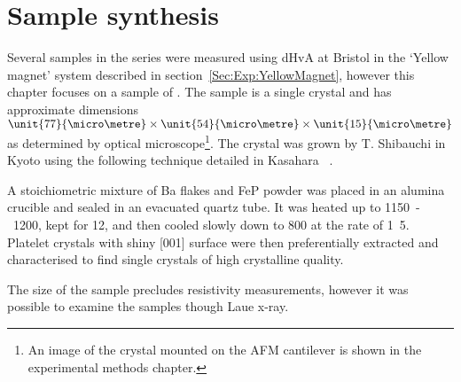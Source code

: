 \section{Sample synthesis}

Several samples in the \BaFeAsP{} series were measured using \ac{dHvA} at Bristol in the `Yellow magnet' system described in section~\ref{Sec:Exp:YellowMagnet}, however this chapter focuses on a sample of \BaFeP. The sample is a single crystal and has approximate dimensions $\unit{77}{\micro\metre}\times\unit{54}{\micro\metre}\times \unit{15}{\micro\metre}$ as determined by optical microscope\footnote{An image of the crystal mounted on the \ac{AFM} cantilever is shown in the experimental methods chapter.}. The crystal was grown by T. Shibauchi in Kyoto using the following technique detailed in Kasahara \etal~\cite{Kasahara2010}. 

A stoichiometric mixture of Ba flakes and FeP powder was placed in an alumina crucible and sealed in an evacuated quartz tube. It was heated up to \unit{1150-1200}{\celsius}, kept for \unit{12}{\hour}, and then cooled slowly down to \unit{800}{\celsius} at the rate of \unit{1.5}{\celsius\per\hour}. Platelet crystals with shiny [001] surface were then preferentially extracted and characterised to find single crystals of high crystalline quality.

The size of the sample precludes resistivity measurements, however it was possible to examine the samples though Laue x-ray. 


